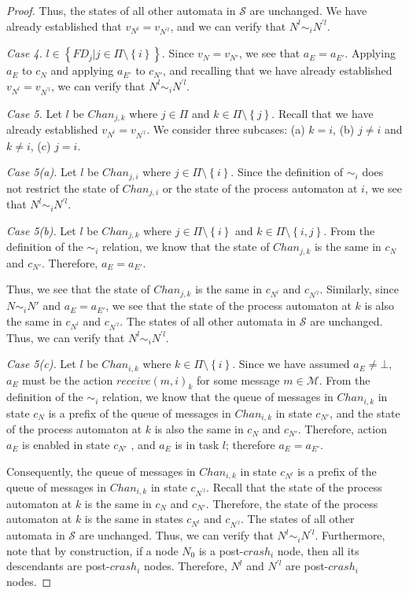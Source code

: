 \documentclass[11pt]{article}
\numberwithin{theorem}{section}
\newcommand{\set}[1]{\left\{#1\right\}}
\begin{document}
\begin{proof}
Thus, the states of all other automata in $\mathcal{S}$ are unchanged. We have already established that $v_{N^l} = v_{N^{\prime l}}$, and we can verify that $N^l \sim_i N^{\prime l}$.
 


\emph{Case 4.} $l \in \set{FD_j | j \in \Pi \setminus \set{i}}$. Since $v_N = v_{N'}$, we see that $a_E = a_{E'}$. Applying $a_E$ to $c_N$ and applying $a_{E'}$ to $c_{N'}$, and recalling that we have already established $v_{N^l} = v_{N^{\prime l}}$, we can verify that $N^l \sim_i N^{\prime l}$.

 
 \emph{Case 5.} Let $l$ be $Chan_{j,k}$ where $j\in \Pi$ and $k \in \Pi \setminus \set{j}$. Recall that we have already established $v_{N^l} = v_{N^{\prime l}}$. 
 We consider three subcases: (a) $k=i$, (b) $j\neq i$ and $k \neq i$, (c) $j = i$.
 
 \emph{Case 5(a).} Let $l$ be $Chan_{j,i}$ where $j \in \Pi \setminus \set{i}$. Since the definition of $\sim_i$ does not restrict the state of $Chan_{j,i}$ or the state of the process automaton at $i$, we see that $N^l \sim_i N^{\prime l}$.
 
 \emph{Case 5(b).} Let $l$ be $Chan_{j,k}$ where $j\in \Pi \setminus \set{i}$ and $k \in \Pi \setminus \set{i,j}$. From the definition of the $\sim_i$ relation, we know that the state of $Chan_{j,k}$ is the same in $c_N$ and $c_{N'}$. Therefore, $a_E = a_{E'}$.
 
 Thus, we see that the state of $Chan_{j,k}$ is the same in $c_{N^l}$ and $c_{N^{\prime l}}$. Similarly, since $N \sim_i N'$ and $a_E = a_{E'}$, we see that the state of the process automaton at $k$ is also the same in $c_{N^l}$ and $c_{N^{\prime l}}$. The states of all other automata in $\mathcal{S}$ are unchanged.
 Thus, we can verify that $N^l \sim_i N^{\prime l}$.
 
 \emph{Case 5(c).} Let $l$ be $Chan_{i,k}$ where $k \in \Pi \setminus \set{i}$. 
 Since we have assumed $a_E \neq \bot$, $a_E$ must be the action $receive(m,i)_k$ for some message $m \in \mathcal{M}$. From the definition of the $\sim_i$ relation, we know that the queue of messages in $Chan_{i,k}$ in state $c_N$ is a prefix of the queue of messages in $Chan_{i,k}$ in state $c_{N'}$, and the state of the process automaton at $k$ is also the same in $c_N$ and $c_{N'}$. Therefore, action $a_{E}$ is enabled in state $c_{N'}$ , and $a_E$ is in task $l$; therefore $a_E = a_{E'}$.
 
 Consequently, the queue of messages in $Chan_{i,k}$ in state $c_{N^l}$ is a prefix of the queue of messages in $Chan_{i,k}$ in state $c_{N^{\prime l}}$. 
 Recall that the state of the process automaton at $k$ is the same in $c_{N}$ and $c_{N'}$. 
 Therefore, the state of the process automaton at $k$ is the same in states $c_{N^l}$ and $c_{N^{\prime l}}$. The states of all other automata in $\mathcal{S}$ are unchanged.
 Thus, we can verify that $N^l \sim_i N^{\prime l}$. Furthermore, note that by construction, if a node $N_0$ is a post-$crash_i$ node, then all its descendants are post-$crash_i$ nodes. Therefore, $N^l$ and $N^{\prime l}$ are post-$crash_i$ nodes.
 \end{proof}
\end{document}
